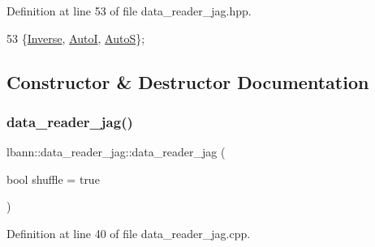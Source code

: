 Definition at line 53 of file data\+\_\+reader\+\_\+jag.\+hpp.


\begin{DoxyCode}
53 \{\hyperlink{classlbann_1_1data__reader__jag_a114c369c8604df385cf7a3ec20c9739ba2d3bba9f202270762169c1c01d2fb7a4}{Inverse}, \hyperlink{classlbann_1_1data__reader__jag_a114c369c8604df385cf7a3ec20c9739bae9c49fc4443020e18086fc83ce0b369b}{AutoI}, \hyperlink{classlbann_1_1data__reader__jag_a114c369c8604df385cf7a3ec20c9739baab2b8e8bef02dfc8ffaae80bdd0a7fd4}{AutoS}\};
\end{DoxyCode}


\subsection{Constructor \& Destructor Documentation}
\mbox{\label{classlbann_1_1data__reader__jag_a8729a52155d4a4319efb77b1b38bc369}} 
\subsubsection{\texorpdfstring{data\+\_\+reader\+\_\+jag()}{data\_reader\_jag()}\hspace{0.1cm}{\footnotesize\ttfamily [1/2]}}
{\footnotesize\ttfamily lbann\+::data\+\_\+reader\+\_\+jag\+::data\+\_\+reader\+\_\+jag (\begin{DoxyParamCaption}\item[{bool}]{shuffle = {\ttfamily true} }\end{DoxyParamCaption})}



Definition at line 40 of file data\+\_\+reader\+\_\+jag.\+cpp.


